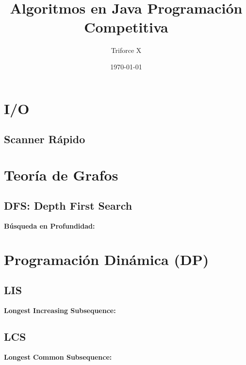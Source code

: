 \documentclass[10pt,letterpaper,twocolumn]{article}
\newcommand{\codigofuente}[1]{

\dotfill
}
\begin{document}
\title{Algoritmos en Java Programación Competitiva}
\author{Triforce X}
\date{\today}
\maketitle

\tableofcontents
\section{I/O}
\subsection{Scanner Rápido}
\small
\codigofuente{./src/scanner1.java}

\section{Teoría de Grafos}
\subsection{DFS: Depth First Search}
\small
\textbf{Búsqueda en Profundidad:}
\codigofuente{./src/teoria_de_grafos/dfs.java}

\section{Programación Dinámica (DP)}
\subsection{LIS}
\small
\textbf{Longest Increasing Subsequence:}
\codigofuente{./src/DP/lis.java}

\subsection{LCS}
\small
\textbf{Longest Common Subsequence:}
\codigofuente{./src/DP/lcs.java}
\end{document}
